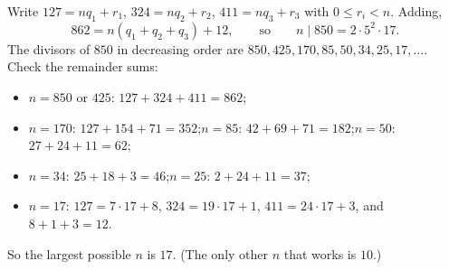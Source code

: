 Write $127=nq_1+r_1$, $324=nq_2+r_2$, $411=nq_3+r_3$ with $0\le r_i<n$. Adding,
\[862=n(q_1+q_2+q_3)+12,\qquad\text{so}\qquad n\mid850=2\cdot5^2\cdot17 .\]
The divisors of $850$ in decreasing order are $850,425,170,85,50,34,25,17,\dots$. Check the remainder sums:
\begin{itemize}
\item $n=850$ or $425$: $127+324+411=862$;
\item $n=170$: $127+154+71=352$;\quad $n=85$: $42+69+71=182$;\quad $n=50$: $27+24+11=62$;
\item $n=34$: $25+18+3=46$;\quad $n=25$: $2+24+11=37$;
\item $n=17$: $127=7\cdot17+8$, $324=19\cdot17+1$, $411=24\cdot17+3$, and $8+1+3=12$.
\end{itemize}
So the largest possible $n$ is $\boxed{17}$. (The only other $n$ that works is $10$.)
